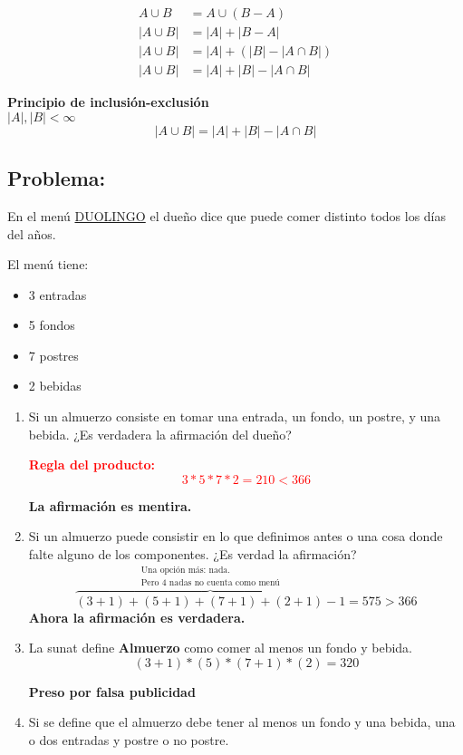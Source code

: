 \documentclass[../main.tex]{subfiles}
\begin{document}
\begin{align*}
	A\cup B &= A \cup(B-A)\\
	|A\cup B| &= |A| + |B-A|\\
	|A\cup B| &= |A| + (|B|-|A\cap B|)\\
	|A\cup B| &= |A| + |B| - |A\cap B|
\end{align*}

\textbf{Principio de inclusión-exclusión}\\
$|A|,|B|<\infty$
\[
	|A\cup B| = |A|+|B|-|A\cap B|
\]

\subsection*{Problema:}%

En el menú \underline{DUOLINGO} el dueño dice que puede comer distinto todos los días
del años.

El menú tiene:
\begin{itemize}
	\item 3 entradas
	\item 5 fondos
	\item 7 postres
	\item 2 bebidas
\end{itemize}
\begin{enumerate}
	\item Si un almuerzo consiste en tomar una entrada, un fondo, un postre,
y una bebida.
¿Es verdadera la afirmación del dueño?

\textbf{\textcolor{red}{Regla del producto:\[3*5*7*2=210 < 366\]}}

\textbf{La afirmación es mentira.}

\item Si un almuerzo puede consistir en lo que definimos antes
o una cosa donde falte alguno de los componentes.
¿Es verdad la afirmación?
\[
	\overbrace{(3+1)+(5+1)+(7+1)+(2+1)-1}^
	{\substack{\text{Una opción más: nada.}\\
			\text{Pero $4$ nadas no cuenta como menú}
	}}=575>366
\]
\textbf{Ahora la afirmación es verdadera.}

\item La sunat define \textbf{Almuerzo} como comer
al menos un fondo y bebida.
\[
	(3+1)*(5)*(7+1)*(2) = 320
\]

\textbf{Preso por falsa publicidad}

\item Si se define que el almuerzo debe tener al menos un fondo
y una bebida, una o dos entradas y postre o no postre.

\end{enumerate}
\end{document}

